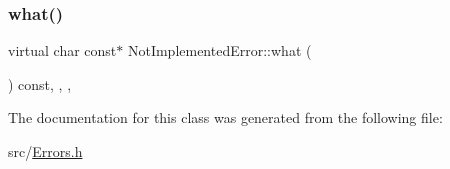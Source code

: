 \subsubsection{\texorpdfstring{what()}{what()}}
{\footnotesize\ttfamily virtual char const$\ast$ Not\+Implemented\+Error\+::what (\begin{DoxyParamCaption}{ }\end{DoxyParamCaption}) const\hspace{0.3cm}{\ttfamily [inline]}, {\ttfamily [override]}, {\ttfamily [virtual]}, {\ttfamily [noexcept]}}



The documentation for this class was generated from the following file\+:\begin{DoxyCompactItemize}
\item 
src/\hyperlink{_errors_8h}{Errors.\+h}\end{DoxyCompactItemize}
